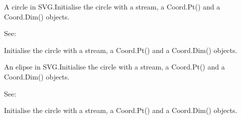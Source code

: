 \documentclass[letterpaper,10pt,english]{sphinxmanual}
\begin{document}

\begin{fulllineitems}
\label{\detokenize{ref/util/plot/SVGWriter:TotalDepth.util.plot.SVGWriter.SVGCircle}}
A circle in SVG.Initialise the circle with a stream, a Coord.Pt() and a
Coord.Dim() objects.

See: 

\begin{fulllineitems}
\label{\detokenize{ref/util/plot/SVGWriter:TotalDepth.util.plot.SVGWriter.SVGCircle.__init__}}
Initialise the circle with a stream, a Coord.Pt() and a
Coord.Dim() objects.

\end{fulllineitems}


\end{fulllineitems}


\begin{fulllineitems}
\label{\detokenize{ref/util/plot/SVGWriter:TotalDepth.util.plot.SVGWriter.SVGElipse}}
An elipse in SVG.Initialise the circle with a stream, a Coord.Pt() and a
Coord.Dim() objects.

See: 

\begin{fulllineitems}
\label{\detokenize{ref/util/plot/SVGWriter:TotalDepth.util.plot.SVGWriter.SVGElipse.__init__}}
Initialise the circle with a stream, a Coord.Pt() and a
Coord.Dim() objects.

\end{fulllineitems}


\end{fulllineitems}
\end{document}
